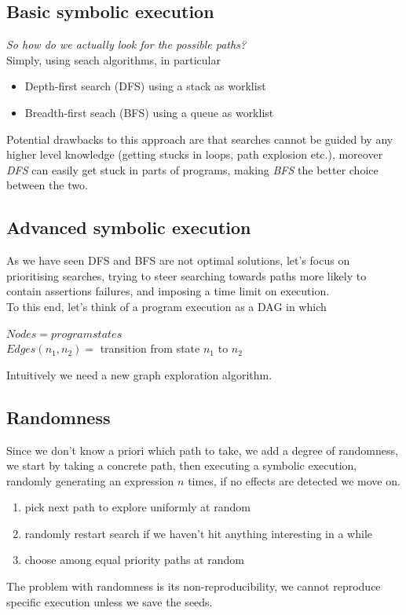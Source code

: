 \documentclass[11pt, oneside]{article}   	%
\begin{document}
\subsection*{Basic symbolic execution}
\emph{So how do we actually look for the possible paths?}\\
Simply, using seach algorithms, in particular
\begin{itemize}
\item Depth-first search (DFS) using a stack as worklist
\item Breadth-first seach (BFS) using a queue as worklist
\end{itemize}
Potential drawbacks to this approach are that searches cannot be guided by any higher level knowledge (getting stucks in loops, path explosion etc.), moreover \emph{DFS} can easily get stuck in parts of programs, making \emph{BFS} the better choice between the two.

\subsection*{Advanced symbolic execution}
As we have seen DFS and BFS are not optimal solutions, let's focus on prioritising searches, trying to steer searching towards paths more likely to contain assertions failures, and imposing a time limit on execution.\\
To this end, let's think of a program execution as a DAG in which

\begin{center}
$Nodes = program states$\\
$Edges(n_1, n_2) =$ transition from state $n_1$ to $n_2$
\end{center}
Intuitively we need a new graph exploration algorithm.

\subsection*{Randomness}
Since we don't know a priori which path to take, we add a degree of randomness,  we start by taking a concrete path, then executing a symbolic execution, randomly generating an expression $n$ times, if no effects are detected we move on.
\begin{enumerate}
\item pick next path to explore uniformly at random
\item randomly restart search if we haven't hit anything interesting in a while
\item choose among equal priority paths at random
\end{enumerate}
The problem with randomness is its non-reproducibility, we cannot reproduce specific execution unless we save the seeds.
\end{document}

